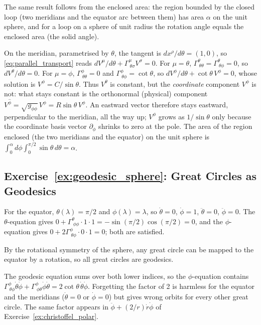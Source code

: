 The same result follows from the enclosed area: the region bounded by the
closed loop (two meridians and the equator arc between them) has area
$\alpha$ on the unit sphere, and for a loop on a sphere of unit radius the
rotation angle equals the enclosed area (the solid angle).

\begin{derivation}
On the meridian, parametrised by $\theta$, the tangent is $dx^\rho/d\theta = (1, 0)$, so
\eqref{eq:parallel_transport} reads $dV^\mu/d\theta + \Gamma^\mu_{\ \theta\sigma}V^\sigma = 0$.
For $\mu = \theta$, $\Gamma^\theta_{\ \theta\theta} = \Gamma^\theta_{\ \theta\phi} = 0$, so
$dV^\theta/d\theta = 0$.
For $\mu = \phi$, $\Gamma^\phi_{\ \theta\theta} = 0$ and $\Gamma^\phi_{\ \theta\phi} = \cot\theta$, so
$dV^\phi/d\theta + \cot\theta\, V^\phi = 0$, whose solution is $V^\phi = C/\sin\theta$.
Thus $V^\theta$ is constant, but the \emph{coordinate} component $V^\phi$ is not: what stays constant
is the orthonormal (physical) component $V^{\hat\phi} = \sqrt{g_{\phi\phi}}\,V^\phi = R\sin\theta\,V^\phi$.
An eastward vector therefore stays eastward, perpendicular to the meridian, all the way up; $V^\phi$
grows as $1/\sin\theta$ only because the coordinate basis vector $\partial_\phi$ shrinks to zero at
the pole. The area of the region enclosed (the two meridians and the equator) on the unit sphere is
$\int_0^\alpha d\phi\int_0^{\pi/2}\sin\theta\,d\theta = \alpha$.
\end{derivation}

\subsection*{Exercise~\ref{ex:geodesic_sphere}: Great Circles as Geodesics}

For the equator, $\theta(\lambda) = \pi/2$ and $\phi(\lambda) = \lambda$,
so $\dot{\theta} = 0$, $\dot{\phi} = 1$, $\ddot{\theta} = 0$,
$\ddot{\phi} = 0$.
The $\theta$-equation gives $0 + \Gamma^\theta_{\ \phi\phi} \cdot 1 \cdot 1
= -\sin(\pi/2)\cos(\pi/2) = 0$, and the
$\phi$-equation gives $0 + 2\Gamma^\phi_{\ \theta\phi} \cdot 0 \cdot 1 = 0$;
both are satisfied.

By the rotational symmetry of the sphere, any great circle can be mapped
to the equator by a rotation, so all great circles are geodesics.

\begin{annotation}
The geodesic equation sums over both lower indices, so the $\phi$-equation contains
$\Gamma^\phi_{\ \theta\phi}\dot\theta\dot\phi + \Gamma^\phi_{\ \phi\theta}\dot\phi\dot\theta
= 2\cot\theta\,\dot\theta\dot\phi$. Forgetting the factor of 2 is harmless for the equator
and the meridians ($\dot\theta = 0$ or $\dot\phi = 0$) but gives wrong orbits for every other great circle. The same factor appears in
$\ddot\phi + (2/r)\dot r\dot\phi$ of Exercise~\ref{ex:christoffel_polar}.
\end{annotation}
